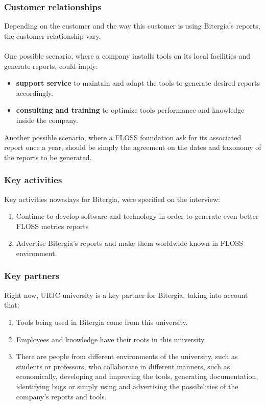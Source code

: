 \documentclass[11pt]{article}
\begin{document}
\subsubsection{Customer relationships}
Depending on the customer and the way this customer is using Bitergia's reports, the customer relationship vary.\\
\\
One possible scenario, where a company installs tools on its local facilities and generate reports, could imply:
\begin{itemize}
\item{\textbf{support service} to maintain and adapt the tools to generate desired reports accordingly.}
\item{\textbf{consulting and training} to optimize tools performance and knowledge inside the company.}
\end{itemize}
Another possible scenario, where a FLOSS foundation ask for its associated report once a year, should be simply the agreement on the dates and taxonomy of the reports to be generated.
\subsubsection{Key activities}
Key activities nowadays for Bitergia, were specified on the interview:
\begin{enumerate}
\item{Continue to develop software and technology in order to generate even better FLOSS metrics reports}
\item{Advertise Bitergia's reports and make them worldwide known in FLOSS environment.}
\end{enumerate}
\subsubsection{Key partners}
Right now, URJC university is a key partner for Bitergia, taking into account that:
\begin{enumerate}
\item{Tools being used in Bitergia come from this university.}
\item{Employees and knowledge have their roots in this university.}
\item{There are people from different environments of the university, such as students or professors, who collaborate in different manners, such as economically, developing and improving the tools, generating documentation, identifying bugs or simply using and advertising the possibilities of the company's reports and tools.}
\end{enumerate}
\end{document}
